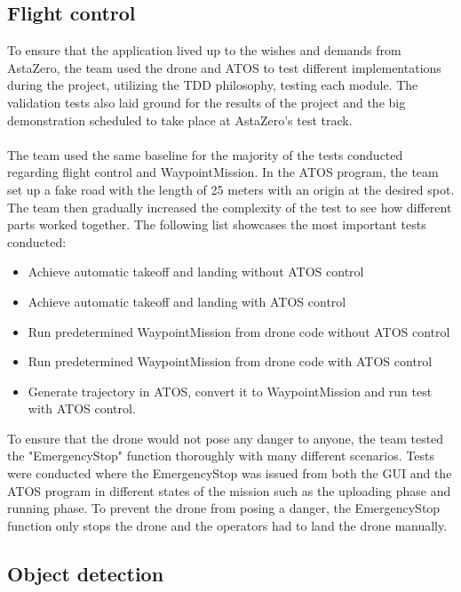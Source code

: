\subsection{Flight control}
To ensure that the application lived up to the wishes and demands from AstaZero, the team used the drone and ATOS to test different implementations during the project, utilizing the TDD philosophy, testing each module. The validation tests also laid ground for the results of the project and the big demonstration scheduled to take place at AstaZero's test track.
\\ \\
The team used the same baseline for the majority of the tests conducted regarding flight control and WaypointMission. In the ATOS program, the team set up a fake road with the length of 25 meters with an origin at the desired spot. The team then gradually increased the complexity of the test to see how different parts worked together. The following list showcases the most important tests conducted:
\begin{itemize}
    \item Achieve automatic takeoff and landing without ATOS control
    \item Achieve automatic takeoff and landing with ATOS control
    \item Run predetermined WaypointMission from drone code  without ATOS control
    \item Run predetermined WaypointMission from drone code with ATOS control
    \item Generate trajectory in ATOS, convert it to WaypointMission and run test with ATOS control.
\end{itemize}
To ensure that the drone would not pose any danger to anyone, the team tested the "EmergencyStop" function thoroughly with many different scenarios. Tests were conducted where the EmergencyStop was issued from both the GUI and the ATOS program in different states of the mission such as the uploading phase and running phase. To prevent the drone from posing a danger, the EmergencyStop function only stops the drone and the operators had to land the drone manually.
\subsection{Object detection}
